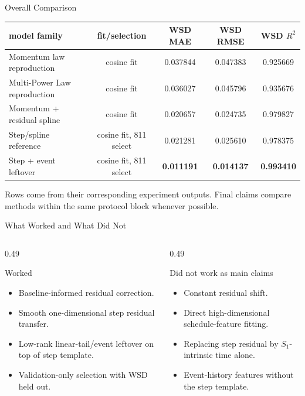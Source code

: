 \documentclass[fontset=fandol,aspectratio=169,10pt]{ctexbeamer}
\newcommand{\smallnote}[1]{{\scriptsize\color{tdltGray}#1}}
\begin{document}
\begin{frame}{Overall Comparison}
  \begin{table}
    \centering
    \scriptsize
    \begin{tabular}{lcccc}
      \toprule
      model family & fit/selection & WSD MAE & WSD RMSE & WSD \(R^2\)\\
      \midrule
      Momentum law reproduction & cosine fit & 0.037844 & 0.047383 & 0.925669\\
      Multi-Power Law reproduction & cosine fit & 0.036027 & 0.045796 & 0.935676\\
      Momentum + residual spline & cosine fit & 0.020657 & 0.024735 & 0.979827\\
      Step/spline reference & cosine fit, 811 select & 0.021281 & 0.025610 & 0.978375\\
      Step + event leftover & cosine fit, 811 select & \textbf{0.011191} & \textbf{0.014137} & \textbf{0.993410}\\
      \bottomrule
    \end{tabular}
  \end{table}
  \smallnote{Rows come from their corresponding experiment outputs. Final claims compare methods within the same protocol block whenever possible.}
\end{frame}

\begin{frame}{What Worked and What Did Not}
  \begin{columns}[T,onlytextwidth]
    \begin{column}{0.49\textwidth}
      \begin{block}{Worked}
        \begin{itemize}
          \item Baseline-informed residual correction.
          \item Smooth one-dimensional step residual transfer.
          \item Low-rank linear-tail/event leftover on top of step template.
          \item Validation-only selection with WSD held out.
        \end{itemize}
      \end{block}
    \end{column}
    \begin{column}{0.49\textwidth}
      \begin{block}{Did not work as main claims}
        \begin{itemize}
          \item Constant residual shift.
          \item Direct high-dimensional schedule-feature fitting.
          \item Replacing step residual by \(S_1\)-intrinsic time alone.
          \item Event-history features without the step template.
        \end{itemize}
      \end{block}
    \end{column}
  \end{columns}
\end{frame}
\end{document}
